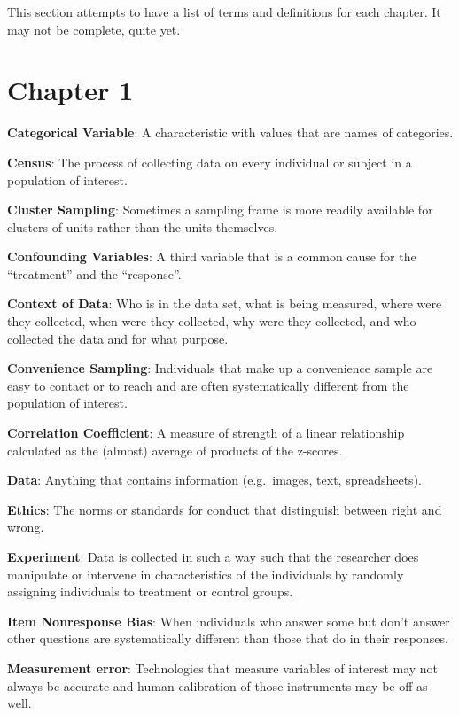 \documentclass[]{book}
\begin{document}
This section attempts to have a list of terms and definitions for each chapter. It may not be complete, quite yet.

\hypertarget{chapter-1}{%
\section{Chapter 1}\label{chapter-1}}

\textbf{Categorical Variable}: A characteristic with values that are names of categories.

\textbf{Census}: The process of collecting data on every individual or subject in a population of interest.

\textbf{Cluster Sampling}: Sometimes a sampling frame is more readily available for clusters of units rather than the units themselves.

\textbf{Confounding Variables}: A third variable that is a common cause for the ``treatment'' and the ``response''.

\textbf{Context of Data}: Who is in the data set, what is being measured, where were they collected, when were they collected, why were they collected, and who collected the data and for what purpose.

\textbf{Convenience Sampling}: Individuals that make up a convenience sample are easy to contact or to reach and are often systematically different from the population of interest.

\textbf{Correlation Coefficient}: A measure of strength of a linear relationship calculated as the (almost) average of products of the z-scores.

\textbf{Data}: Anything that contains information (e.g.~images, text, spreadsheets).

\textbf{Ethics}: The norms or standards for conduct that distinguish between right and wrong.

\textbf{Experiment}: Data is collected in such a way such that the researcher does manipulate or intervene in characteristics of the individuals by randomly assigning individuals to treatment or control groups.

\textbf{Item Nonresponse Bias}: When individuals who answer some but don't answer other questions are systematically different than those that do in their responses.

\textbf{Measurement error}: Technologies that measure variables of interest may not always be accurate and human calibration of those instruments may be off as well.
\end{document}
